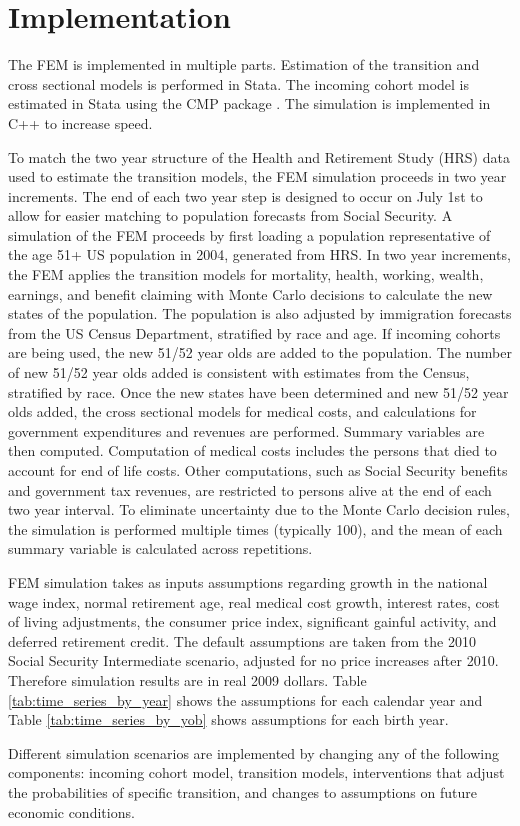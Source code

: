 \section{Implementation}
The FEM is implemented in multiple parts. Estimation of the transition and cross 
sectional models is performed in Stata.
The incoming cohort model is estimated in Stata using the CMP package \citep{statacmp2011}.
The simulation is implemented in C++ to increase speed.  

To match the two year structure of the Health and Retirement Study (HRS) data used to estimate the transition models, the FEM simulation 
proceeds in two year increments. The end of each two year step is designed to occur on July 1st to allow for easier matching to population 
forecasts from Social Security. A simulation of the FEM proceeds by first loading a population representative of the age 51+ US population 
in 2004, generated from HRS. In two year increments, the FEM applies the transition models for mortality, health, working, wealth, 
earnings, and benefit claiming with Monte Carlo decisions to calculate the new states of the population. The population is also adjusted by 
immigration forecasts from the US Census Department, stratified by race and age. If incoming cohorts are being used, the new 51/52 year 
olds are added to the population. The number of new 51/52 year olds added is consistent with estimates from the Census, stratified by race. 
Once the new states have been determined and new 51/52 year olds added, the cross sectional models for medical costs, and calculations for 
government expenditures and revenues are performed. Summary variables are then computed. Computation of medical costs includes the persons 
that died to account for end of life costs. Other computations, such as Social Security benefits and government tax revenues, are 
restricted to persons alive at the end of each two year interval. To eliminate uncertainty due to the Monte Carlo decision rules, the 
simulation is performed multiple times (typically 100), and the mean of each summary variable is calculated across repetitions. 

FEM simulation takes as inputs assumptions regarding growth in the national wage index, normal retirement age, real medical cost growth, 
interest rates, cost of living adjustments, the consumer price index, significant gainful activity, and deferred retirement credit. The 
default assumptions are taken from the 2010 Social Security Intermediate scenario, adjusted for no price increases after 2010. Therefore 
simulation results are in real 2009 dollars.  Table \ref{tab:time_series_by_year} shows the assumptions for each calendar year and Table 
\ref{tab:time_series_by_yob} shows assumptions for each birth year.

Different simulation scenarios are implemented by changing any of the following components: incoming cohort model, transition models, 
interventions that adjust the probabilities of specific transition, and changes to assumptions on future economic conditions.  	


